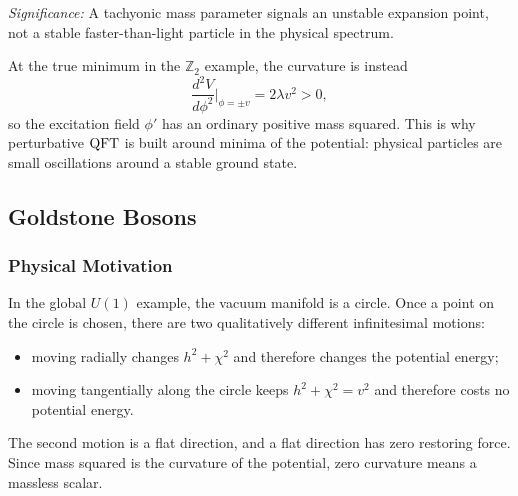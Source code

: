 
\textit{Significance:} A tachyonic mass parameter signals an unstable expansion point, not a stable faster-than-light particle in the physical spectrum.

At the true minimum in the $\mathbb Z_2$ example, the curvature is instead
\begin{equation}
  \frac{d^2V}{d\phi^2}\bigg|_{\phi=\pm v}=2\lambda v^2>0,
  \label{eq:lec15:true_vacuum_positive_curvature}
\end{equation}
so the excitation field $\phi'$ has an ordinary positive mass squared. This is why perturbative $\mathrm{QFT}$ is built around minima of the potential: physical particles are small oscillations around a stable ground state.

\subsection{Goldstone Bosons}\label{subsec:lec15:goldstone}

\subsubsection*{Physical Motivation}

In the global $U(1)$ example, the vacuum manifold is a circle. Once a point on the circle is chosen, there are two qualitatively different infinitesimal motions:
\begin{itemize}
  \item moving radially changes $h^2+\chi^2$ and therefore changes the potential energy;
  \item moving tangentially along the circle keeps $h^2+\chi^2=v^2$ and therefore costs no potential energy.
\end{itemize}
The second motion is a flat direction, and a flat direction has zero restoring force. Since mass squared is the curvature of the potential, zero curvature means a massless scalar.


